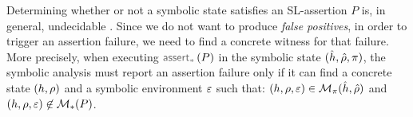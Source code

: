 {\small {}}
\hspace{-3pt}Determining whether or not a symbolic state satisfies an SL-assertion $P$ is, in general, 
undecidable \cite{citemeplease}. Since we do not want to produce \emph{false positives}, in order to trigger 
an assertion failure, we need to find a concrete witness for that failure. More precisely, when executing 
$\sepassert(P)$ in the symbolic state $(\hat{h}, \hat\rho, \pi)$, the symbolic analysis must  
report an assertion failure only if it can find a concrete state $(h, \rho)$  and a symbolic environment 
$\varepsilon$ such that: 
$(h, \rho, \varepsilon) \in \mathcal{M}_{\pi}(\hat{h}, \hat\rho)$ and
$(h, \rho, \varepsilon) \not\in \mathcal{M}_{*}(P)$.
